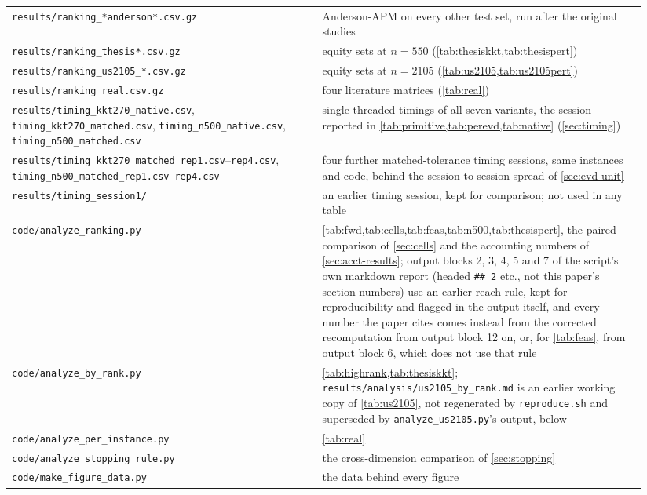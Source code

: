 \begin{longtable}{p{0.46\linewidth}p{0.48\linewidth}}
\texttt{results/ranking\_*anderson*.csv.gz} & Anderson-APM on every other test set, run after the original studies\\
\texttt{results/ranking\_thesis*.csv.gz} & equity sets at $n=550$ (\cref{tab:thesiskkt,tab:thesispert})\\
\texttt{results/ranking\_us2105\_*.csv.gz} & equity sets at $n=2105$ (\cref{tab:us2105,tab:us2105pert})\\
\texttt{results/ranking\_real.csv.gz} & four literature matrices (\cref{tab:real})\\
\texttt{results/timing\_kkt270\_native.csv}, \texttt{timing\_kkt270\_matched.csv}, \texttt{timing\_n500\_native.csv}, \texttt{timing\_n500\_matched.csv} & single-threaded timings of all seven variants, the session reported in \cref{tab:primitive,tab:perevd,tab:native} (\cref{sec:timing})\\
\texttt{results/timing\_kkt270\_matched\_rep1.csv}--\texttt{rep4.csv}, \texttt{timing\_n500\_matched\_rep1.csv}--\texttt{rep4.csv} & four further matched-tolerance timing sessions, same instances and code, behind the session-to-session spread of \cref{sec:evd-unit}\\
\texttt{results/timing\_session1/} & an earlier timing session, kept for comparison; not used in any table\\
\texttt{code/analyze\_ranking.py} & \cref{tab:fwd,tab:cells,tab:feas,tab:n500,tab:thesispert}, the paired comparison of \cref{sec:cells} and the accounting numbers of \cref{sec:acct-results}; output blocks 2, 3, 4, 5 and 7 of the script's own markdown report (headed \texttt{\#\# 2} etc., not this paper's section numbers) use an earlier reach rule, kept for reproducibility and flagged in the output itself, and every number the paper cites comes instead from the corrected recomputation from output block 12 on, or, for \cref{tab:feas}, from output block 6, which does not use that rule\\
\texttt{code/analyze\_by\_rank.py} & \cref{tab:highrank,tab:thesiskkt}; \texttt{results/analysis/us2105\_by\_rank.md} is an earlier working copy of \cref{tab:us2105}, not regenerated by \texttt{reproduce.sh} and superseded by \texttt{analyze\_us2105.py}'s output, below\\
\texttt{code/analyze\_per\_instance.py} & \cref{tab:real}\\
\texttt{code/analyze\_stopping\_rule.py} & the cross-dimension comparison of \cref{sec:stopping}\\
\texttt{code/make\_figure\_data.py} & the data behind every figure\\

\end{longtable}
